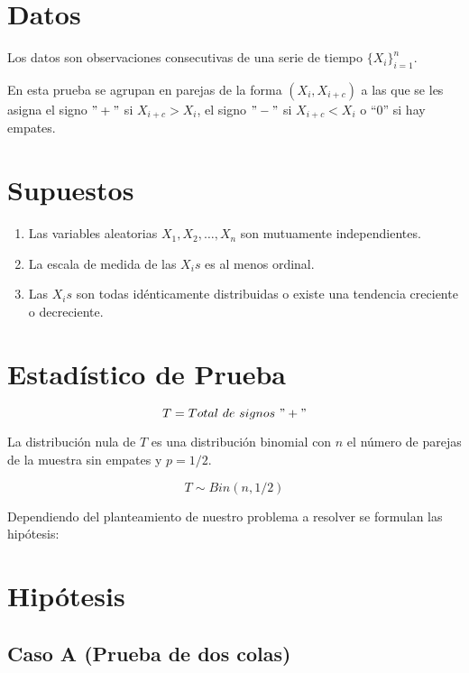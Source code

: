 \documentclass[
  a4paper,
  oneside,
  openany]{book}
\begin{document}
\hypertarget{datos-4}{%
\section{Datos}\label{datos-4}}

Los datos son observaciones consecutivas de una serie de tiempo \(\{X_{i}\}^{n}_{i=1}\).

En esta prueba se agrupan en parejas de la forma \((X_{i},X_{i+c})\) a las que se les asigna el signo \("+"\) si \(X_{i+c} > X_{i}\), el signo \("-"\) si \(X_{i+c} < X_{i}\) o ``0'' si hay empates.

\hypertarget{supuestos-4}{%
\section{Supuestos}\label{supuestos-4}}

\begin{enumerate}
\def\labelenumi{\arabic{enumi})}
\item
  Las variables aleatorias \(X_{1}, X_{2}, \ldots, X_{n}\) son mutuamente independientes.
\item
  La escala de medida de las \(X_{i}s\) es al menos ordinal.
\item
  Las \(X_{i}s\) son todas idénticamente distribuidas o existe una tendencia creciente o decreciente.
\end{enumerate}

\hypertarget{estaduxedstico-de-prueba-4}{%
\section{Estadístico de Prueba}\label{estaduxedstico-de-prueba-4}}

\[T=Total\ de\ signos\ "+"\]

La distribución nula de \(T\) es una distribución binomial con \(n\) el número de parejas de la muestra sin empates y \(p=1/2\).

\[T\sim Bin(n,1/2)\]

Dependiendo del planteamiento de nuestro problema a resolver se formulan las hipótesis:

\hypertarget{hipuxf3tesis-4}{%
\section{Hipótesis}\label{hipuxf3tesis-4}}

\hypertarget{caso-a-prueba-de-dos-colas-4}{%
\subsection*{Caso A (Prueba de dos colas)}\label{caso-a-prueba-de-dos-colas-4}}
\end{document}
